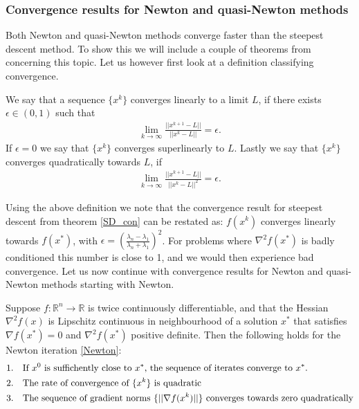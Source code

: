 \subsubsection{Convergence results for Newton and quasi-Newton methods}
Both Newton and quasi-Newton methods converge faster than the steepest descent method. To show this we will include a couple of theorems from \cite{nocedal2006numerical}
concerning this topic. Let us however first look at a definition classifying convergence.
\begin{definition}
We say that a sequence $\{x^k\}$ converges linearly to a limit $L$, if there exists $\epsilon\in(0,1)$ such that
\begin{align*}
\lim_{k\rightarrow\infty}\frac{||x^{k+1}-L||}{||x^k-L||} =\epsilon.
\end{align*} 
If $\epsilon=0$ we say that $\{x^k\}$ converges superlinearly to $L$. Lastly we say that $\{x^k\}$ converges quadratically towards $L$, if
\begin{align*}
\lim_{k\rightarrow\infty}\frac{||x^{k+1}-L||}{||x^k-L||^2} =\epsilon.
\end{align*}
\end{definition}
\noindent
Using the above definition we note that the convergence result for steepest descent from theorem \ref{SD_con} can be restated as: $f(x^k)$ converges linearly towards $f(x^*)$, with $\epsilon=(\frac{\lambda_n-\lambda_1}{\lambda_n+\lambda_1})^2$. For problems where $\nabla^2 f(x^*)$ is badly conditioned this number is close to 1, and we would then experience bad convergence. Let us now continue with convergence results for Newton and quasi-Newton methods starting with Newton.
\begin{theorem}
\label{Newton_con}
Suppose $f:\mathbb{R}^n\rightarrow\mathbb{R}$ is twice continuously differentiable, and that the Hessian $\nabla^2 f(x)$ is Lipschitz continuous in neighbourhood of a solution $x^*$ that satisfies $\nabla f(x^*)=0$ and $\nabla^2 f(x^*)$ positive definite. Then the following holds for the Newton iteration \ref{Newton}:
\begin{align*}
1.\quad&\textrm{If $x^0$ is suffichently close to $x^*$, the sequence of iterates converge to $x^*$.}\\
2.\quad&\textrm{The rate of convergence of $\{x^k\}$ is quadratic}\\
3.\quad&\textrm{The sequence of gradient norms $ \{||\nabla f(x^k)||\}$ converges towards zero quadratically}
\end{align*}
\end{theorem}
